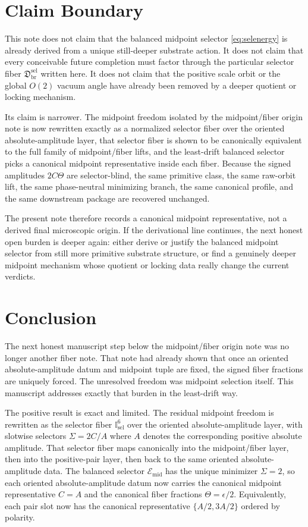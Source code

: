 \documentclass[11pt]{article}
\newcommand{\MidSelSector}{\mathfrak D_{\mathrm{br}}^{\mathrm{sel}}}
\newcommand{\SelDom}{\mathbb I_{\mathrm{sel}}}
\newcommand{\SelEnergy}{\mathscr E_{\mathrm{mid}}}
\begin{document}
\section{Claim Boundary}

This note does not claim that the balanced midpoint selector \eqref{eq:selenergy} is already derived from a unique still-deeper substrate action. It does not claim that every conceivable future completion must factor through the particular selector fiber \(\MidSelSector\) written here. It does not claim that the positive scale orbit or the global \(O(2)\) vacuum angle have already been removed by a deeper quotient or locking mechanism.

Its claim is narrower. The midpoint freedom isolated by the midpoint/fiber origin note is now rewritten exactly as a normalized selector fiber over the oriented absolute-amplitude layer, that selector fiber is shown to be canonically equivalent to the full family of midpoint/fiber lifts, and the least-drift balanced selector picks a canonical midpoint representative inside each fiber. Because the signed amplitudes \(2C\Theta\) are selector-blind, the same primitive class, the same raw-orbit lift, the same phase-neutral minimizing branch, the same canonical profile, and the same downstream package are recovered unchanged.

The present note therefore records a canonical midpoint representative, not a derived final microscopic origin. If the derivational line continues, the next honest open burden is deeper again: either derive or justify the balanced midpoint selector from still more primitive substrate structure, or find a genuinely deeper midpoint mechanism whose quotient or locking data really change the current verdicts.

\section{Conclusion}

The next honest manuscript step below the midpoint/fiber origin note was no longer another fiber note. That note had already shown that once an oriented absolute-amplitude datum and midpoint tuple are fixed, the signed fiber fractions are uniquely forced. The unresolved freedom was midpoint selection itself. This manuscript addresses exactly that burden in the least-drift way.

The positive result is exact and limited. The residual midpoint freedom is rewritten as the selector fiber \(\SelDom^{6}\) over the oriented absolute-amplitude layer, with slotwise selectors \(\Sigma=2C/A\) where \(A\) denotes the corresponding positive absolute amplitude. That selector fiber maps canonically into the midpoint/fiber layer, then into the positive-pair layer, then back to the same oriented absolute-amplitude data. The balanced selector \(\SelEnergy\) has the unique minimizer \(\Sigma=2\), so each oriented absolute-amplitude datum now carries the canonical midpoint representative \(C=A\) and the canonical fiber fractions \(\Theta=\epsilon/2\). Equivalently, each pair slot now has the canonical representative \(\{A/2,3A/2\}\) ordered by polarity.
\end{document}
